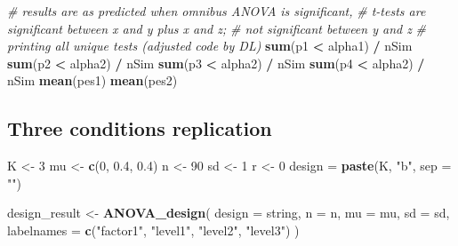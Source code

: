 \documentclass[]{book}
\newenvironment{Shaded}{\begin{snugshade}}{\end{snugshade}}
\newcommand{\CommentTok}[1]{\textcolor[rgb]{0.56,0.35,0.01}{\textit{#1}}}
\newcommand{\DataTypeTok}[1]{\textcolor[rgb]{0.13,0.29,0.53}{#1}}
\newcommand{\DecValTok}[1]{\textcolor[rgb]{0.00,0.00,0.81}{#1}}
\newcommand{\FloatTok}[1]{\textcolor[rgb]{0.00,0.00,0.81}{#1}}
\newcommand{\KeywordTok}[1]{\textcolor[rgb]{0.13,0.29,0.53}{\textbf{#1}}}
\newcommand{\NormalTok}[1]{#1}
\newcommand{\OperatorTok}[1]{\textcolor[rgb]{0.81,0.36,0.00}{\textbf{#1}}}
\newcommand{\StringTok}[1]{\textcolor[rgb]{0.31,0.60,0.02}{#1}}
\begin{document}
\begin{Shaded}
\begin{Highlighting}[]
\CommentTok{# results are as predicted when omnibus ANOVA is significant,}
\CommentTok{# t-tests are significant between x and y plus x and z; }
\CommentTok{# not significant between y and z}
\CommentTok{# printing all unique tests (adjusted code by DL)}
\KeywordTok{sum}\NormalTok{(p1 }\OperatorTok{<}\StringTok{ }\NormalTok{alpha1) }\OperatorTok{/}\StringTok{ }\NormalTok{nSim}
\KeywordTok{sum}\NormalTok{(p2 }\OperatorTok{<}\StringTok{ }\NormalTok{alpha2) }\OperatorTok{/}\StringTok{ }\NormalTok{nSim}
\KeywordTok{sum}\NormalTok{(p3 }\OperatorTok{<}\StringTok{ }\NormalTok{alpha2) }\OperatorTok{/}\StringTok{ }\NormalTok{nSim}
\KeywordTok{sum}\NormalTok{(p4 }\OperatorTok{<}\StringTok{ }\NormalTok{alpha2) }\OperatorTok{/}\StringTok{ }\NormalTok{nSim}
\KeywordTok{mean}\NormalTok{(pes1)}
\KeywordTok{mean}\NormalTok{(pes2)}
\end{Highlighting}
\end{Shaded}

\hypertarget{three-conditions-replication}{%
\subsection{Three conditions replication}\label{three-conditions-replication}}

\begin{Shaded}
\begin{Highlighting}[]
\NormalTok{K <-}\StringTok{ }\DecValTok{3}
\NormalTok{mu <-}\StringTok{ }\KeywordTok{c}\NormalTok{(}\DecValTok{0}\NormalTok{, }\FloatTok{0.4}\NormalTok{, }\FloatTok{0.4}\NormalTok{)}
\NormalTok{n <-}\StringTok{ }\DecValTok{90}
\NormalTok{sd <-}\StringTok{ }\DecValTok{1}
\NormalTok{r <-}\StringTok{ }\DecValTok{0}
\NormalTok{design =}\StringTok{ }\KeywordTok{paste}\NormalTok{(K, }\StringTok{"b"}\NormalTok{, }\DataTypeTok{sep =} \StringTok{""}\NormalTok{)}
\end{Highlighting}
\end{Shaded}

\begin{Shaded}
\begin{Highlighting}[]
\NormalTok{design_result <-}\StringTok{ }\KeywordTok{ANOVA_design}\NormalTok{(}
  \DataTypeTok{design =}\NormalTok{ string,}
  \DataTypeTok{n =}\NormalTok{ n,}
  \DataTypeTok{mu =}\NormalTok{ mu,}
  \DataTypeTok{sd =}\NormalTok{ sd,}
  \DataTypeTok{labelnames =} \KeywordTok{c}\NormalTok{(}\StringTok{"factor1"}\NormalTok{, }\StringTok{"level1"}\NormalTok{, }\StringTok{"level2"}\NormalTok{, }\StringTok{"level3"}\NormalTok{)}
\NormalTok{  )}
\end{Highlighting}
\end{Shaded}
\end{document}
